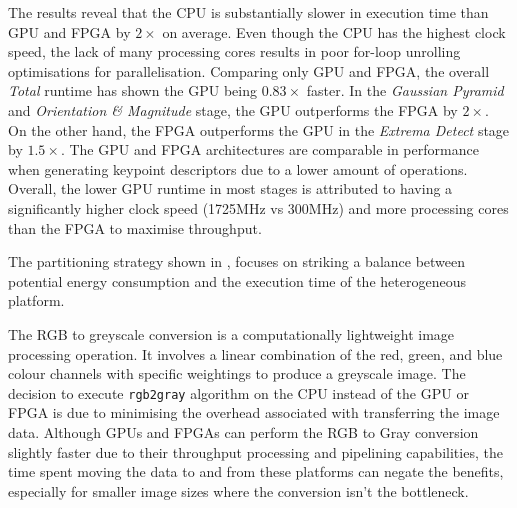 The results reveal that the CPU is substantially slower in execution time than GPU and FPGA by $2\times$ on average. Even though the CPU has the highest clock speed, the lack of many processing cores results in poor for-loop unrolling optimisations for parallelisation. Comparing only GPU and FPGA, the overall \textit{Total} runtime has shown the GPU being $0.83 \times$ faster. In the \textit{Gaussian Pyramid} and \textit{Orientation \& Magnitude} stage, the GPU outperforms the FPGA by $2 \times$. On the other hand, the FPGA outperforms the GPU in the \textit{Extrema Detect} stage by $1.5 \times$. The GPU and FPGA architectures are comparable in performance when generating keypoint descriptors due to a lower amount of operations. Overall, the lower GPU runtime in most stages is attributed to having a significantly higher clock speed (\eg 1725MHz vs 300MHz) and more processing cores than the FPGA to maximise throughput.


The partitioning strategy shown in , focuses on striking a balance between potential energy consumption and the execution time of the heterogeneous platform.

The RGB to greyscale conversion is a computationally lightweight image processing operation. It involves a linear combination of the red, green, and blue colour channels with specific weightings to produce a greyscale image. The decision to execute \texttt{rgb2gray} algorithm on the CPU instead of the GPU or FPGA is due to minimising the overhead associated with transferring the image data. 
Although GPUs and FPGAs can perform the RGB to Gray conversion slightly faster due to their throughput processing and pipelining capabilities, the time spent moving the data to and from these platforms can negate the benefits, especially for smaller image sizes where the conversion isn't the bottleneck. 


